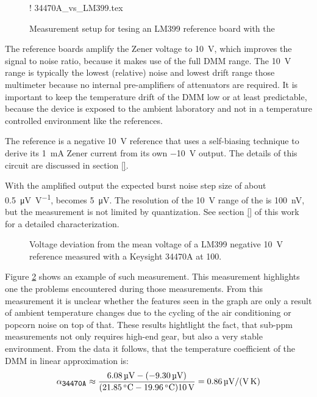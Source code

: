 \begin{figure}[ht]
    \centering
    \resizebox {0.8\textwidth} {!} {
        {34470A_vs_LM399.tex}
    } %
    \caption{Measurement setup for tesing an LM399 reference board with the }
    \label{fig:lm399_vs_34470a_setup}
\end{figure}

The reference boards amplify the Zener voltage to \qty{10}{\volt}, which improves the signal to noise ratio, because it makes use of the full DMM range. The \qty{10}{\volt} range is typically the lowest (relative) noise and lowest drift range those multimeter because no internal pre-amplifiers of attenuators are required. It is important to keep the temperature drift of the DMM low or at least predictable, because the device is exposed to the ambient laboratory and not in a temperature controlled environment like the references.

\newpage
The reference is a negative \qty{10}{\volt} reference that uses a self-biasing technique to derive its \qty{1}{\mA} Zener current from its own \qty{-10}{\volt} output. The details of this circuit are discussed in section \ref{}.


With the amplified output the expected burst noise step size of about \qty[per-mode=symbol]{0.5}{\micro\volt \per \volt}, becomes \qty{5}{\micro\volt}. The resolution of the \qty{10}{\volt} range of the  is \qty{100}{\nano \volt}, but the measurement is not limited by quantization. See section \ref{} of this work for a detailed characterization.

\begin{figure}[ht]
    \centering
    
    \caption{Voltage deviation from the mean voltage of a LM399 negative \qty{10}{\volt} reference measured with a Keysight 34470A at \qty{100}{\plc}.}
    \label{fig:lm399_vs_34470a}
\end{figure}

Figure \ref{fig:lm399_vs_34470a} shows an example of such measurement. This measurement highlights one the problems encountered during those measurements. From this measurement it is unclear whether the features seen in the graph are only a result of ambient temperature changes due to the cycling of the air conditioning or popcorn noise on top of that. These results hightlight the fact, that sub-\unit{ppm} measurements not only requires high-end gear, but also a very stable environment. From the data it follows, that the temperature coefficient of the DMM in linear approximation is:
\begin{equation}
    \alpha_{\texttt{\small 34470A}} \approx \frac{\qty{6.08}{\micro\volt}-(-\qty{9.30}{\micro\volt})}{(\qty{21.85}{\celsius}-\qty{19.96}{\celsius})\qty{10}{\volt}} = \qty[per-mode=symbol]{0.86}{\micro\volt \per \volt \per \kelvin}
\end{equation}

